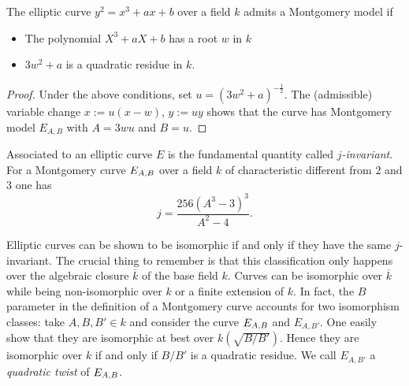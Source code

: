 \documentclass[../main/main.tex]{subfiles}
\begin{document}
\begin{proposition}
	The elliptic curve $y^2 = x^3 + ax + b$ over a field $k$ admits a Montgomery model if
	\begin{itemize}
		\item The polynomial $X^3 + aX + b$ has a root $w$ in $k$
		\item $3w^2 + a$ is a quadratic residue in $k$.
	\end{itemize}
\end{proposition}
\begin{proof}
	Under the above conditions, set $u = (3w^2+a)^{-\frac{1}{2}}$.
	The (admissible) variable change $x:= u(x-w)$, $y:= uy$ shows that the curve has Montgomery model $E_{A, B}$ with $A = 3wu$ and $B=u$.
\end{proof}

Associated to an elliptic curve $E$ is the fundamental quantity called $j$\textit{-invariant}.
For a Montgomery curve $E_{A, B}$ over a field $k$ of characteristic different from $2$ and $3$ one has
\[
	j = \frac{256(A^3-3)^3}{A^2 - 4}.
\]

Elliptic curves can be shown to be isomorphic if and only if they have the same $j$-invariant.
The crucial thing to remember is that this classification only happens over the algebraic closure $\overbar{k}$ of the base field $k$.
Curves can be isomorphic over $\overbar{k}$ while being non-isomorphic over $k$ or a finite extension of $k$.
In fact, the $B$ parameter in the definition of a Montgomery curve accounts for two isomorphism classes: take $A, B, B'\in k$ and consider the curve $E_{A, B}$ and $E_{A, B'}$.
One easily show that they are isomorphic at best over $k(\sqrt{B/B'})$.
Hence they are isomorphic over $k$ if and only if $B/B'$ is a quadratic residue.
We call $E_{A, B'}$ a \textit{quadratic twist} of $E_{A, B}$.
\end{document}
